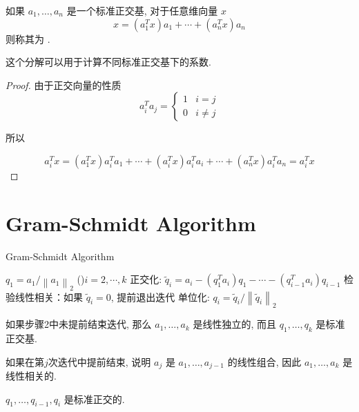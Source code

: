 \begin{definition}[ $ x $ 在标准正交基下的标准正交分解]
    如果 $ a_{1}, \ldots, a_{n} $ 是一个标准正交基, 对于任意维向量 $ x $
$$
x=\left(a_{1}^{T} x\right) a_{1}+\cdots+\left(a_{n}^{T} x\right) a_{n}
$$
则称其为 . 
\end{definition}

    这个分解可以用于计算不同标准正交基下的系数. 

\begin{proof}
    由于正交向量的性质
    $$ a_{i}^{T} a_{j}=\left\{\begin{array}{ll}1 & i=j \\ 0 & i \neq j\end{array}\right. $$

    所以

    $$ a_{i}^{T} x=\left(a_{1}^{T} x\right) a_{i}^{T} a_{1}+\cdots+\left(a_{i}^{T} x\right) a_{i}^{T} a_{i}+\cdots+\left(a_{n}^{T} x\right) a_{i}^{T} a_{n}=a_{i}^{T} x $$
\end{proof}

\section{Gram-Schmidt Algorithm}
\label{Chap:Gram-Schmidt Algorithm}
\begin{algorithm}[htbp]
    \caption{Gram-Schmidt Algorithm}
    $ q_{1}=a_{1} /\left\|a_{1}\right\|_{2} $\;
    \While(){$i=2,\cdots,k$}{
        正交化: $ \widetilde{q}_{i}=a_{i}-\left(q_{1}^{T} a_{i}\right) q_{1}-\cdots-\left(q_{i-1}^{T} a_{i}\right) q_{i-1} $\;
        检验线性相关：如果 $ \widetilde{q}_{i}=0 $, 提前退出迭代\;
        单位化: $ q_{i}=\widetilde{q}_{i} /\left\|\widetilde{q}_{i}\right\|_{2} $\;
    }
\end{algorithm}

如果步骤2中未提前结束迭代, 那么 $ a_{1}, \ldots, a_{k} $ 是线性独立的, 而且 $ q_{1}, \ldots, q_{k} $ 是标准正交基. 

如果在第$j$次迭代中提前结束, 说明 $ a_{j} $ 是 $ a_{1}, \ldots, a_{j-1} $ 的线性组合, 因此 $ a_{1}, \ldots, a_{k} $ 是线性相关的. 

\begin{theorem}
    \label{thm: qs-are-orthogonal}

    $q_{1}, \ldots, q_{i-1}, q_{i} $ 是标准正交的. 
\end{theorem}

